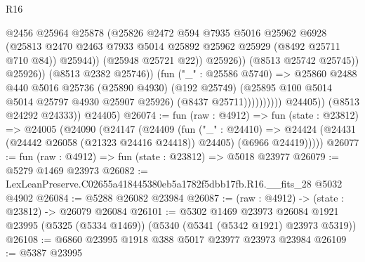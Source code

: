 \begin{lexlean}{R16}
\begin{coremodule}
                                            @2456
                                            @25964
                                            @25878
                                            (@25826
                                              @2472
                                              @594
                                              @7935
                                              @5016
                                              @25962
                                              @6928
                                              (@25813
                                                @2470
                                                @2463
                                                @7933
                                                @5014
                                                @25892
                                                @25962
                                                @25929
                                                (@8492 @25711 @710 @84))
                                              @25944))
                                          (@25948 @25721 @22))
                                        @25926))
                                    (@8513 @25742 @25745))
                                  @25926))
                              (@8513 @2382 @25746))
                            (fun ("_" : @25586 @5740) =>
                            @25860
                              @2488
                              @440
                              @5016
                              @25736
                              (@25890 @4930)
                              (@192 @25749)
                              (@25895 @100 @5014 @5014 @25797 @4930 @25907 @25926)
                              (@8437 @25711))))))))))
            @24405))
        (@8513 @24292 @24333))
      @24405)
@26074 := fun (raw : @4912) =>
  fun (state : @23812) =>
  @24005
    (@24090
      (@24147
        (@24409
          (fun ("_" : @24410) =>
          @24424 (@24431 (@24442 @26058 (@21323 @24416 @24418)) @24405) (@6966 @24419)))))
@26077 := fun (raw : @4912) => fun (state : @23812) => @5018 @23977
@26079 := @5279 @1469 @23973
@26082 := LexLeanPreserve.C02655a418445380eb5a1782f5dbb17fb.R16.__fits_28 @5032 @4902
@26084 := @5288 @26082 @23984
@26087 := (raw : @4912) -> (state : @23812) -> @26079 @26084
@26101 := @5302
    @1469
    @23973
    @26084
    @1921
    @23995
    (@5325 (@5334 @1469))
    (@5340 (@5341 (@5342 @1921) @23973 @5319))
@26108 := @6860 @23995 @1918 @388 @5017 @23977 @23973 @23984
@26109 := @5387 @23995

\end{coremodule}
\end{lexlean}
